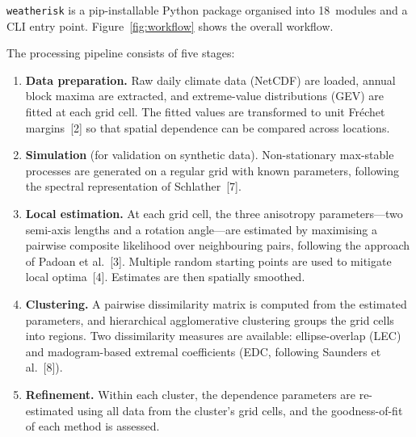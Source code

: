 \documentclass[preprint,12pt,a4paper]{elsarticle}
\begin{document}
\texttt{weatherisk} is a pip-installable Python package organised
into 18~modules and a CLI entry point.  Figure~\ref{fig:workflow}
shows the overall workflow.

The processing pipeline consists of five stages:
\begin{enumerate}
\item \textbf{Data preparation.}
  Raw daily climate data (NetCDF) are loaded, annual block maxima are
  extracted, and extreme-value distributions (GEV) are fitted at each
  grid cell.  The fitted values are transformed to unit
  Fr\'{e}chet margins~[2] so that spatial dependence can be compared
  across locations.
\item \textbf{Simulation} (for validation on synthetic data).
  Non-stationary max-stable processes are generated on a regular grid
  with known parameters, following the spectral
  representation of Schlather~[7].
\item \textbf{Local estimation.}
  At each grid cell, the three anisotropy parameters---two semi-axis
  lengths and a rotation angle---are estimated by maximising a
  pairwise composite likelihood over neighbouring pairs, following
  the approach of Padoan et al.~[3].  Multiple random starting
  points are used to mitigate local optima~[4].  Estimates are
  then spatially smoothed.
\item \textbf{Clustering.}
  A pairwise dissimilarity matrix is computed from the estimated
  parameters, and hierarchical agglomerative clustering groups the
  grid cells into regions.  Two dissimilarity measures are available:
  ellipse-overlap (LEC) and madogram-based extremal coefficients
  (EDC, following Saunders et al.~[8]).
\item \textbf{Refinement.}
  Within each cluster, the dependence parameters are re-estimated
  using all data from the cluster's grid cells, and the
  goodness-of-fit of each method is assessed.
\end{enumerate}
\end{document}
